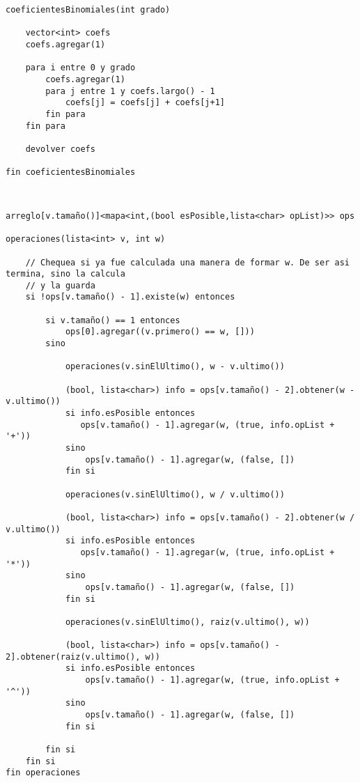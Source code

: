 \begin{codesnippet}
\begin{verbatim}
coeficientesBinomiales(int grado)

    vector<int> coefs
    coefs.agregar(1)

    para i entre 0 y grado
        coefs.agregar(1)
        para j entre 1 y coefs.largo() - 1
            coefs[j] = coefs[j] + coefs[j+1]
        fin para
    fin para

    devolver coefs

fin coeficientesBinomiales
\end{verbatim}
\end{codesnippet}

\setcounter{subsection}{8}
\subsection{}

\subsubsection{}

\begin{codesnippet}
\begin{verbatim}

arreglo[v.tamaño()]<mapa<int,(bool esPosible,lista<char> opList)>> ops

operaciones(lista<int> v, int w)

    // Chequea si ya fue calculada una manera de formar w. De ser asi termina, sino la calcula
    // y la guarda
    si !ops[v.tamaño() - 1].existe(w) entonces

        si v.tamaño() == 1 entonces
            ops[0].agregar((v.primero() == w, []))
        sino
            
            operaciones(v.sinElUltimo(), w - v.ultimo())

            (bool, lista<char>) info = ops[v.tamaño() - 2].obtener(w - v.ultimo())
            si info.esPosible entonces
               ops[v.tamaño() - 1].agregar(w, (true, info.opList + '+'))
            sino
                ops[v.tamaño() - 1].agregar(w, (false, [])
            fin si

            operaciones(v.sinElUltimo(), w / v.ultimo())

            (bool, lista<char>) info = ops[v.tamaño() - 2].obtener(w / v.ultimo())
            si info.esPosible entonces
               ops[v.tamaño() - 1].agregar(w, (true, info.opList + '*'))
            sino
                ops[v.tamaño() - 1].agregar(w, (false, [])
            fin si

            operaciones(v.sinElUltimo(), raiz(v.ultimo(), w))

            (bool, lista<char>) info = ops[v.tamaño() - 2].obtener(raiz(v.ultimo(), w))
            si info.esPosible entonces
                ops[v.tamaño() - 1].agregar(w, (true, info.opList + '^'))
            sino
                ops[v.tamaño() - 1].agregar(w, (false, [])
            fin si
            
        fin si
    fin si
fin operaciones
\end{verbatim}
\end{codesnippet}


